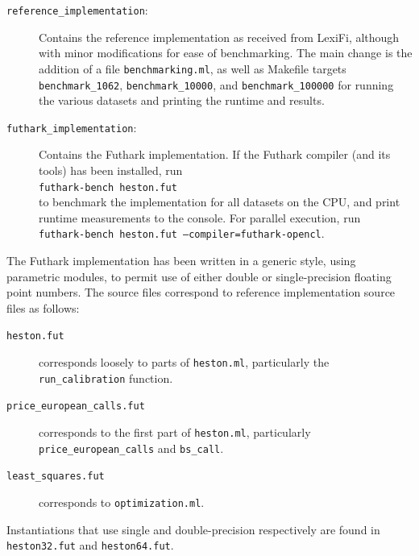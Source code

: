 \documentclass{article}
\begin{document}
\begin{description}
\item[\texttt{reference\_implementation}:] Contains the reference
  implementation as received from LexiFi, although with minor
  modifications for ease of benchmarking.  The main change is the
  addition of a file \texttt{benchmarking.ml}, as well as Makefile
  targets \texttt{benchmark\_1062}, \texttt{benchmark\_10000}, and
  \texttt{benchmark\_100000} for running the various datasets and
  printing the runtime and results.
\item[\texttt{futhark\_implementation}:] Contains the Futhark
  implementation.  If the Futhark compiler (and its tools) has been
  installed, run\\
  \texttt{futhark-bench~heston.fut}\\ to benchmark the implementation
  for all datasets on the CPU, and print runtime measurements to the
  console.  For parallel execution, run\\
  \texttt{futhark-bench~heston.fut~--compiler=futhark-opencl}.
\end{description}

The Futhark implementation has been written in a generic style, using
parametric modules, to permit use of either double or single-precision
floating point numbers.  The source files correspond to reference
implementation source files as follows:

\begin{description}
\item[\texttt{heston.fut}] corresponds loosely to parts of
  \texttt{heston.ml}, particularly the \texttt{run\_calibration}
  function.
\item[\texttt{price\_european\_calls.fut}] corresponds to the first
  part of \texttt{heston.ml}, particularly
  \texttt{price\_european\_calls} and \texttt{bs\_call}.
\item[\texttt{least\_squares.fut}] corresponds to
  \texttt{optimization.ml}.
\end{description}

Instantiations that use single and double-precision respectively are
found in \texttt{heston32.fut} and \texttt{heston64.fut}.
\end{document}
